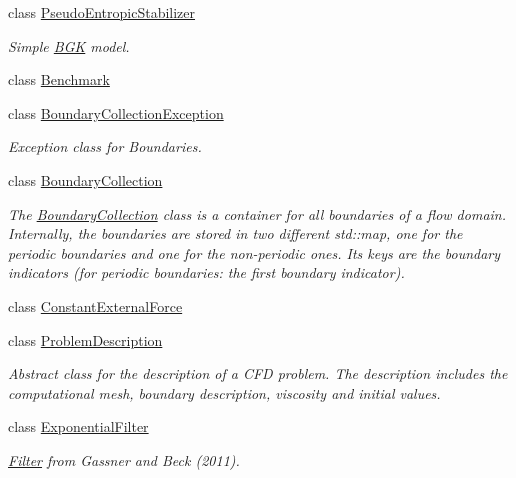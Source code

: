 \begin{DoxyCompactItemize}
class \hyperlink{classnatrium_1_1PseudoEntropicStabilizer}{PseudoEntropicStabilizer}
\begin{DoxyCompactList}\small\item\em Simple \hyperlink{classnatrium_1_1BGK}{BGK} model. \item\end{DoxyCompactList}\item 
class \hyperlink{classnatrium_1_1Benchmark}{Benchmark}
\item 
class \hyperlink{classnatrium_1_1BoundaryCollectionException}{BoundaryCollectionException}
\begin{DoxyCompactList}\small\item\em Exception class for Boundaries. \item\end{DoxyCompactList}\item 
class \hyperlink{classnatrium_1_1BoundaryCollection}{BoundaryCollection}
\begin{DoxyCompactList}\small\item\em The \hyperlink{classnatrium_1_1BoundaryCollection}{BoundaryCollection} class is a container for all boundaries of a flow domain. Internally, the boundaries are stored in two different std::map, one for the periodic boundaries and one for the non-\/periodic ones. Its keys are the boundary indicators (for periodic boundaries: the first boundary indicator). \item\end{DoxyCompactList}\item 
class \hyperlink{classnatrium_1_1ConstantExternalForce}{ConstantExternalForce}
\item 
class \hyperlink{classnatrium_1_1ProblemDescription}{ProblemDescription}
\begin{DoxyCompactList}\small\item\em Abstract class for the description of a CFD problem. The description includes the computational mesh, boundary description, viscosity and initial values. \item\end{DoxyCompactList}\item 
class \hyperlink{classnatrium_1_1ExponentialFilter}{ExponentialFilter}
\begin{DoxyCompactList}\small\item\em \hyperlink{classnatrium_1_1Filter}{Filter} from Gassner and Beck (2011). \item\end{DoxyCompactList}\item 

\end{DoxyCompactItemize}

